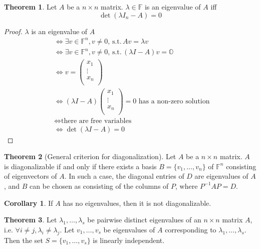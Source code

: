 \documentclass[fleqn, a4paper, 12pt]{article}
\theoremstyle{definition}
\theoremstyle{theorem}
\newtheorem{theorem}{Theorem} %
\newtheorem{corollary}{Corollary}
\theoremstyle{remark}
\newcommand{\suchthat}{\mathrm{\,s.t.\,}}
\numberwithin{corollary}{theorem}
\numberwithin{equation}{theorem}
\begin{document}
\begin{theorem}
	Let $A$ be a $n \times n$ matrix. $\lambda \in \mathbb{F}$ is an eigenvalue of $A$ iff
	\begin{equation*}
		\det (\lambda I_n - A) = 0
	\end{equation*}
\end{theorem}

\begin{proof}
	$\lambda$ is an eigenvalue of $A$
	\begin{align*}
		&\iff \exists v \in \mathbb{F}^n, v \neq 0, \suchthat Av = \lambda v\\
		&\iff \exists v \in \mathbb{F}^n, v \neq 0, \suchthat (\lambda I - A) v = \mathbb{O}\\
		&\iff v = 
		\begin{pmatrix}
			x_1\\
			\vdots\\
			x_n\\
		\end{pmatrix}\\
		&\iff (\lambda I - A) 
		\begin{pmatrix}
			x_1\\
			\vdots\\
			x_n\\
		\end{pmatrix}
		= 0 \text{ has a non-zero solution }\\
		&\iff \text{there are free variables }\\
		&\iff \det (\lambda I - A) = 0
	\end{align*}
\end{proof}

\begin{theorem}[General criterion for diagonalization]\label{general criterion for diagonalization}
	Let $A$ be a $n \times n$ matrix. $A$ is diagonalizable if and only if there exists a basis $B = \{v_1, \dots, v_n\}$ of $\mathbb{F}^n$ consisting of eigenvectors of $A$. In such a case, the diagonal entries of $D$ are eigenvalues of $A$, and $B$ can be chosen as consisting of the columns of $P$, where $P^{-1} A P = D$. 
\end{theorem}

\begin{corollary}
	If $A$ has no eigenvalues, then it is not diagonalizable.
\end{corollary}

\begin{theorem}
	Let $\lambda_1, \dots, \lambda_s$ be pairwise distinct eigenvalues of an $n \times n$ matrix $A$, i.e. $\forall i \neq j, \lambda_i \neq \lambda_j$. Let $v_1, \dots, v_s$ be eigenvalues of $A$ corresponding to $\lambda_1, \dots, \lambda_s$. Then the set $S = \{v_1, \dots, v_s\}$ is linearly independent.
\end{theorem}
\end{document}
